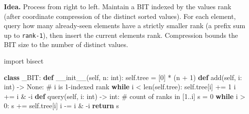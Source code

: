 \documentclass[11pt]{article}
\newenvironment{Shaded}{\begin{snugshade}}{\end{snugshade}}
\newcommand{\BuiltInTok}[1]{\textcolor[rgb]{0.50,0.55,0.55}{#1}}
\newcommand{\CommentTok}[1]{\textcolor[rgb]{0.48,0.49,0.49}{#1}}
\newcommand{\ControlFlowTok}[1]{\textcolor[rgb]{0.99,0.74,0.29}{\textbf{#1}}}
\newcommand{\DecValTok}[1]{\textcolor[rgb]{0.96,0.45,0.00}{#1}}
\newcommand{\FunctionTok}[1]{\textcolor[rgb]{0.56,0.27,0.68}{#1}}
\newcommand{\ImportTok}[1]{\textcolor[rgb]{0.15,0.68,0.38}{#1}}
\newcommand{\KeywordTok}[1]{\textcolor[rgb]{0.81,0.81,0.76}{\textbf{#1}}}
\newcommand{\NormalTok}[1]{\textcolor[rgb]{0.81,0.81,0.76}{#1}}
\newcommand{\OperatorTok}[1]{\textcolor[rgb]{0.81,0.81,0.76}{#1}}
\newcommand{\VariableTok}[1]{\textcolor[rgb]{0.15,0.68,0.68}{#1}}
\begin{document}
\textbf{Idea.} Process from right to left. Maintain a BIT indexed by the value\textquotesingle s rank (after coordinate compression of the distinct sorted values). For each element, query how many already-seen elements have a strictly smaller rank (a prefix sum up to \texttt{rank-1}), then insert the current element\textquotesingle s rank. Compression bounds the BIT size to the number of distinct values.


\begin{Shaded}
\begin{Highlighting}[]
\ImportTok{import}\NormalTok{ bisect}

\KeywordTok{class}\NormalTok{ \_BIT:}
    \KeywordTok{def} \FunctionTok{\_\_init\_\_}\NormalTok{(}\VariableTok{self}\NormalTok{, n: }\BuiltInTok{int}\NormalTok{):}
        \VariableTok{self}\NormalTok{.tree }\OperatorTok{=}\NormalTok{ [}\DecValTok{0}\NormalTok{] }\OperatorTok{*}\NormalTok{ (n }\OperatorTok{+} \DecValTok{1}\NormalTok{)}
    \KeywordTok{def}\NormalTok{ add(}\VariableTok{self}\NormalTok{, i: }\BuiltInTok{int}\NormalTok{) }\OperatorTok{{-}\textgreater{}} \VariableTok{None}\NormalTok{:          }\CommentTok{\# i is 1{-}indexed rank}
        \ControlFlowTok{while}\NormalTok{ i }\OperatorTok{\textless{}} \BuiltInTok{len}\NormalTok{(}\VariableTok{self}\NormalTok{.tree):}
            \VariableTok{self}\NormalTok{.tree[i] }\OperatorTok{+=} \DecValTok{1}
\NormalTok{            i }\OperatorTok{+=}\NormalTok{ i }\OperatorTok{\&} \OperatorTok{{-}}\NormalTok{i}
    \KeywordTok{def}\NormalTok{ query(}\VariableTok{self}\NormalTok{, i: }\BuiltInTok{int}\NormalTok{) }\OperatorTok{{-}\textgreater{}} \BuiltInTok{int}\NormalTok{:         }\CommentTok{\# count of ranks in [1..i]}
\NormalTok{        s }\OperatorTok{=} \DecValTok{0}
        \ControlFlowTok{while}\NormalTok{ i }\OperatorTok{\textgreater{}} \DecValTok{0}\NormalTok{:}
\NormalTok{            s }\OperatorTok{+=} \VariableTok{self}\NormalTok{.tree[i]}
\NormalTok{            i }\OperatorTok{{-}=}\NormalTok{ i }\OperatorTok{\&} \OperatorTok{{-}}\NormalTok{i}
        \ControlFlowTok{return}\NormalTok{ s}


\end{Highlighting}
\end{Shaded}
\end{document}
